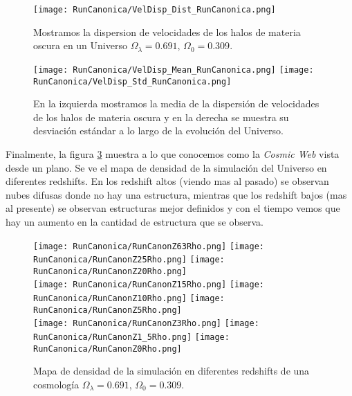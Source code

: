 \begin{figure}[H]
    \centering
    \texttt{[image: RunCanonica/VelDisp\_Dist\_RunCanonica.png]}
    \caption[Distribución de la dispersión de velocidades]{\footnotesize Mostramos la dispersion de velocidades de los halos de materia oscura en un Universo $\Omega_\lambda = 0.691 $, $\Omega_0 = 0.309$.}
    \label{fig:Canon-VelDispDist}
\end{figure}

\begin{figure}[H]
    \centering
    \texttt{[image: RunCanonica/VelDisp\_Mean\_RunCanonica.png]}
    \texttt{[image: RunCanonica/VelDisp\_Std\_RunCanonica.png]}
    \caption[Media y desviación estándar de la dispersión de velocidades]{\footnotesize En la izquierda mostramos la media de la dispersión de velocidades de los halos de materia oscura y en la derecha se muestra su desviación estándar a lo largo de la evolución del Universo.}
    \label{fig:Canon-VelDispStats}
\end{figure}

Finalmente, la figura \ref{fig:CanonRunDensityMap} muestra a lo que conocemos como la \emph{Cosmic Web} vista desde un plano. Se ve el mapa de densidad de la simulación del Universo en diferentes redshifts. En los redshift altos (viendo mas al pasado) se observan nubes difusas donde no hay una estructura, mientras que los redshift bajos (mas al presente) se observan estructuras mejor definidos y con el tiempo vemos que hay un aumento en la cantidad de estructura que se observa.

\begin{figure}[H]
    \centering

    \texttt{[image: RunCanonica/RunCanonZ63Rho.png]}   %
    \texttt{[image: RunCanonica/RunCanonZ25Rho.png]}   %
    \texttt{[image: RunCanonica/RunCanonZ20Rho.png]}   %
    \\
    \texttt{[image: RunCanonica/RunCanonZ15Rho.png]}   %
    \texttt{[image: RunCanonica/RunCanonZ10Rho.png]}   %
    \texttt{[image: RunCanonica/RunCanonZ5Rho.png]}    %
    \\
    \texttt{[image: RunCanonica/RunCanonZ3Rho.png]}    %
    \texttt{[image: RunCanonica/RunCanonZ1\_5Rho.png]}  %
    \texttt{[image: RunCanonica/RunCanonZ0Rho.png]}    %
    \caption[Mapa de densidad de un Universo en en diferentes redshift]{ \footnotesize Mapa de densidad de la simulación en diferentes redshifts de una cosmología $\Omega_\lambda = 0.691 $, $\Omega_0 = 0.309$. }
    \label{fig:CanonRunDensityMap}
\end{figure}

